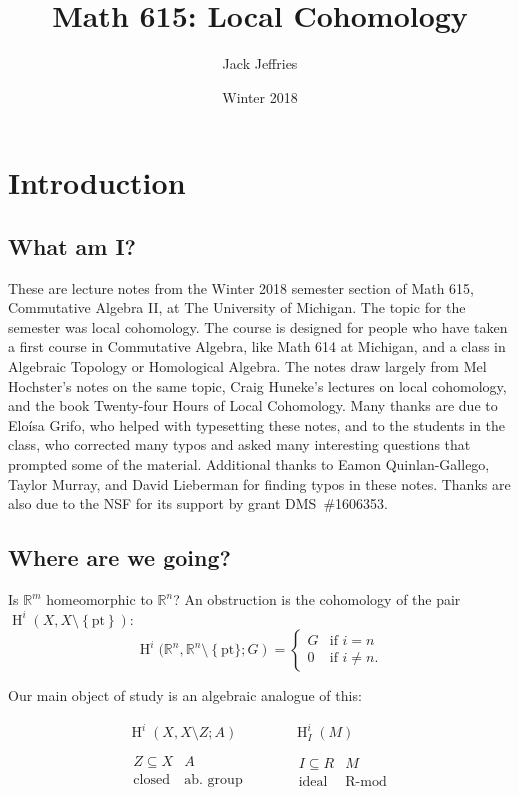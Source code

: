 \documentclass[11pt]{book}
\title{Math 615: Local Cohomology}
\author{Jack Jeffries}
\numberwithin{equation}{section}
\numberwithin{theorem}{chapter}
\theoremstyle{definition}
\newtheorem*{basic properties}{Basic Properties}
\newtheorem*{Important Remark}{Important Remark}
\theoremstyle{remark}
\renewcommand{\H}{\operatorname{H}}
\begin{document}
\date{Winter 2018}
\maketitle

\tableofcontents

\setcounter{chapter}{-1}
\chapter{Introduction}

\section{What am I?}

These are lecture notes from the Winter 2018 semester section of Math 615, Commutative Algebra II, at The University of Michigan. The topic for the semester was local cohomology. The course is designed for people who have taken a first course in Commutative Algebra, like Math 614 at Michigan, and a class in Algebraic Topology or Homological Algebra. The notes draw largely from Mel Hochster's notes on the same topic, Craig Huneke's lectures on local cohomology, and the book Twenty-four Hours of Local Cohomology. Many thanks are due to Elo\'isa Grifo, who helped with typesetting these notes, and to the students in the class, who corrected many typos and asked many interesting questions that prompted some of the material. Additional thanks to Eamon Quinlan-Gallego, Taylor Murray, and David Lieberman for finding typos in these notes. Thanks are also due to the NSF for its support by grant DMS~\#1606353.

\section{Where are we going?}

Is $\mathbb{R}^m$ homeomorphic to $\mathbb{R}^n$? An obstruction is the cohomology of the pair $\H^i(X,X \setminus \left\lbrace \textrm{pt} \right\rbrace)$:
$$\H^i(\mathbb{R}^n, \mathbb{R}^n \setminus \left\lbrace \textrm{pt}\rbrace ; G \right) = \left\lbrace \begin{array}{ll} G & \textrm{if } i=n \\ 0 & \textrm{if } i \neq n. \end{array} \right.$$

Our main object of study is an algebraic analogue of this:


$$\begin{array}{ccccccc}
\H^i(X,X \setminus  Z; A ) &&&& \H^i_I(M) \\
& \\
\begin{array}{cc} Z \subseteq X & A \\ \textrm{closed} & \textrm{ab. group} \end{array} 
&&&&
\begin{array}{cc} I \subseteq R & M \\ \textrm{ideal} & \textrm{R-mod} \end{array} \\
\end{array}$$
\end{document}
